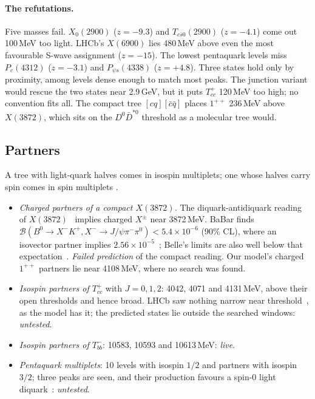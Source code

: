 \paragraph{The refutations.} Five masses fail. $X_0(2900)$ ($z=-9.3$) and $T_{c\bar s0}(2900)$ ($z=-4.1$) come out 100\,MeV too light.
LHCb's $X(6900)$ lies 480\,MeV above even the most favourable S-wave assignment ($z=-15$). The lowest pentaquark levels miss
$P_c(4312)$ ($z=-3.1$) and $P_{\psi s}(4338)$ ($z=+4.8$). Three states hold only by proximity, among levels dense enough to match most
peaks. The junction variant would rescue the two states near 2.9\,GeV, but it puts $T_{cc}^+$ 120\,MeV too high; no convention fits all.
The compact tree $[cq][\bar c\bar q]$ places $1^{++}$ 236\,MeV above $X(3872)$, which sits on the $D^0\bar D^{*0}$ threshold as a
molecular tree would.

\subsection{Partners}\label{sec:exotics-partners}

A tree with light-quark halves comes in isospin multiplets; one whose halves carry spin comes in spin multiplets .
\begin{itemize}[leftmargin=*,itemsep=1pt]
\item \emph{Charged partners of a compact $X(3872)$.} The diquark-antidiquark reading of $X(3872)$~\cite{maiani2005} implies charged
$X^\pm$ near 3872\,MeV. BaBar finds $\mathcal B(B^0\to X^-K^+,X^-\to J/\psi\pi^-\pi^0)<5.4\times10^{-6}$ (90\% CL), where an isovector
partner implies $2.56\times10^{-5}$~\cite{babar2005h}; Belle's limits are also well below that expectation~\cite{belle2011h}.
\emph{Failed prediction} of the compact reading. Our model's charged $1^{++}$ partners lie near 4108\,MeV, where no search was found.
\item \emph{Isospin partners of $T_{cc}^+$} with $J=0,1,2$: 4042, 4071 and 4131\,MeV, above their open thresholds and hence broad. LHCb
saw nothing narrow near threshold~\cite{lhcb2022i}, as the model has it; the predicted states lie outside the searched windows:
\emph{untested}.
\item \emph{Isospin partners of $T_{bb}^-$}: 10583, 10593 and 10613\,MeV: \emph{live}.
\item \emph{Pentaquark multiplets}: 10 levels with isospin $1/2$ and partners with isospin $3/2$; three peaks are seen, and their
production favours a spin-0 light diquark~\cite{maiani2015}: \emph{untested}.
\end{itemize}

